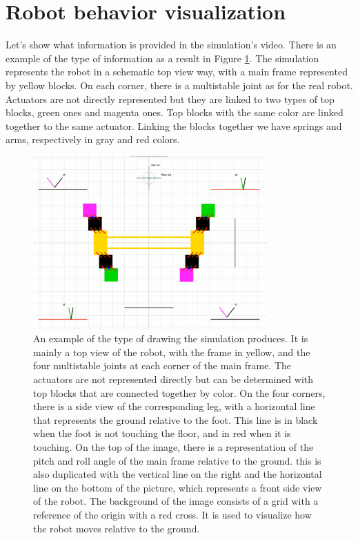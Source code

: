     \section{Robot behavior visualization}
        Let's show what information is provided in the simulation's video. There is an example of the type of information as a result in Figure \ref{fig:drawing}. The simulation represents the robot in a schematic top view way, with a main frame represented by yellow blocks. On each corner, there is a multistable joint as for the real robot. Actuators are not directly represented but they are linked to two types of top blocks, green ones and magenta ones. Top blocks with the same color are linked together to the same actuator. Linking the blocks together we have springs and arms, respectively in gray and red colors.
        
        \begin{figure}[h]
            \centering
            \includegraphics[width=0.8\textwidth]{images/drawing.png}
            \caption{An example of the type of drawing the simulation produces. It is mainly a top view of the robot, with the frame in yellow, and the four multistable joints at each corner of the main frame. The actuators are not represented directly but can be determined with top blocks that are connected together by color. On the four corners, there is a side view of the corresponding leg, with a horizontal line that represents the ground relative to the foot. This line is in black when the foot is not touching the floor, and in red when it is touching. On the top of the image, there is a representation of the pitch and roll angle of the main frame relative to the ground. this is also duplicated with the vertical line on the right and the horizontal line on the bottom of the picture, which represents a front side view of the robot. The background of the image consists of a grid with a reference of the origin with a red cross. It is used to visualize how the robot moves relative to the ground.}
            \label{fig:drawing}
        \end{figure}
        
